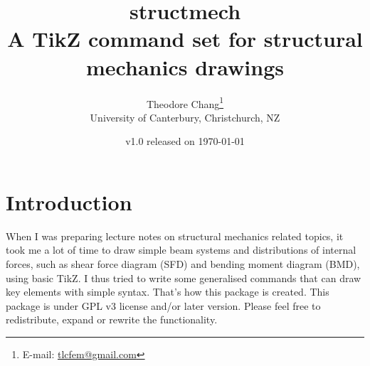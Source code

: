 \documentclass[10pt,a4paper]{article}
\title{structmech\\\large{}A TikZ command set for structural mechanics drawings}
\author{Theodore Chang\footnote{E-mail: \href{tlcfem@gmail.com}{tlcfem@gmail.com}}\\[2mm]\normalsize{}University of Canterbury, Christchurch, NZ}
\date{\normalsize{}v1.0 released on \today}
\begin{document}
\maketitle
\section{Introduction}
When I was preparing lecture notes on structural mechanics related topics, it took me a lot of time to draw simple beam systems and distributions of internal forces, such as shear force diagram (SFD) and bending moment diagram (BMD), using basic TikZ. I thus tried to write some generalised commands that can draw key elements with simple syntax. That's how this package is created. This package is under GPL v3 license and/or later version. Please feel free to redistribute, expand or rewrite the functionality.
\end{document}
